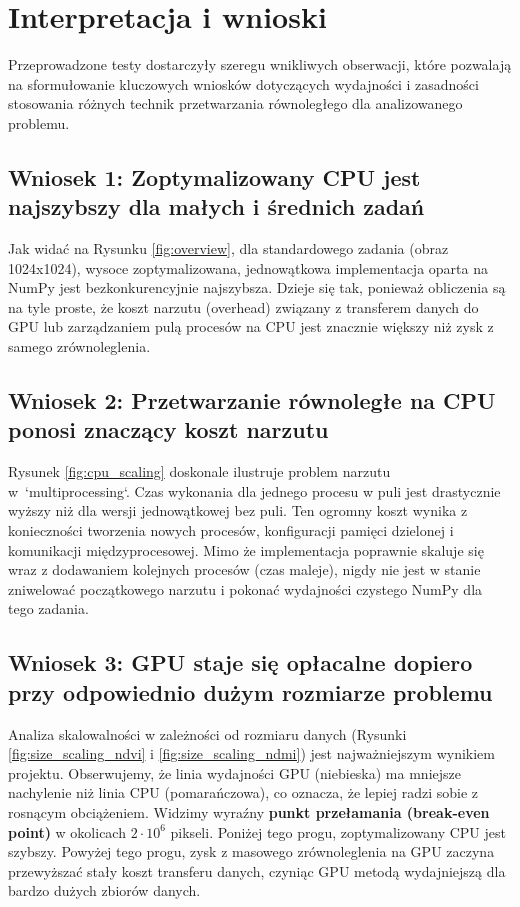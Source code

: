 \documentclass[12pt,a4paper]{article}
\begin{document}
\newpage

\section{Interpretacja i wnioski}
Przeprowadzone testy dostarczyły szeregu wnikliwych obserwacji, które pozwalają na sformułowanie kluczowych wniosków dotyczących wydajności i zasadności stosowania różnych technik przetwarzania równoległego dla analizowanego problemu.

\subsection{Wniosek 1: Zoptymalizowany CPU jest najszybszy dla małych i średnich zadań}
Jak widać na Rysunku \ref{fig:overview}, dla standardowego zadania (obraz 1024x1024), wysoce zoptymalizowana, jednowątkowa implementacja oparta na NumPy jest bezkonkurencyjnie najszybsza. Dzieje się tak, ponieważ obliczenia są na tyle proste, że koszt narzutu (overhead) związany z transferem danych do GPU lub zarządzaniem pulą procesów na CPU jest znacznie większy niż zysk z samego zrównoleglenia.

\subsection{Wniosek 2: Przetwarzanie równoległe na CPU ponosi znaczący koszt narzutu}
Rysunek \ref{fig:cpu_scaling} doskonale ilustruje problem narzutu w~`multiprocessing`. Czas wykonania dla jednego procesu w puli jest drastycznie wyższy niż dla wersji jednowątkowej bez puli. Ten ogromny koszt wynika z konieczności tworzenia nowych procesów, konfiguracji pamięci dzielonej i komunikacji międzyprocesowej. Mimo że implementacja poprawnie skaluje się wraz z dodawaniem kolejnych procesów (czas maleje), nigdy nie jest w stanie zniwelować początkowego narzutu i pokonać wydajności czystego NumPy dla tego zadania.

\subsection{Wniosek 3: GPU staje się opłacalne dopiero przy odpowiednio dużym rozmiarze problemu}
Analiza skalowalności w zależności od rozmiaru danych (Rysunki \ref{fig:size_scaling_ndvi} i \ref{fig:size_scaling_ndmi}) jest najważniejszym wynikiem projektu. Obserwujemy, że linia wydajności GPU (niebieska) ma mniejsze nachylenie niż linia CPU (pomarańczowa), co oznacza, że lepiej radzi sobie z rosnącym obciążeniem. Widzimy wyraźny \textbf{punkt przełamania (break-even point)} w okolicach \(2 \cdot 10^6\) pikseli. Poniżej tego progu, zoptymalizowany CPU jest szybszy. Powyżej tego progu, zysk z masowego zrównoleglenia na GPU zaczyna przewyższać stały koszt transferu danych, czyniąc GPU metodą wydajniejszą dla bardzo dużych zbiorów danych.
\end{document}
